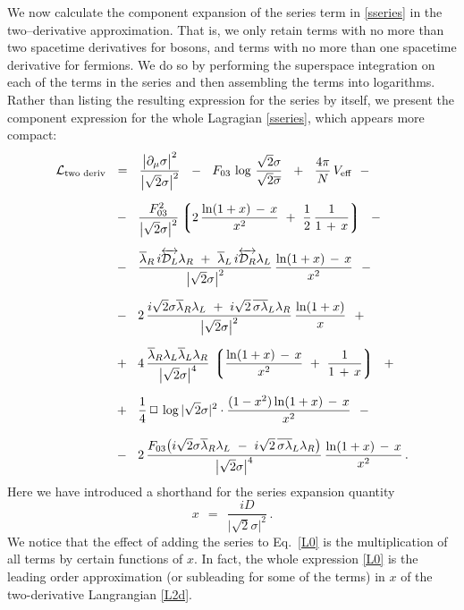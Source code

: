 \documentclass[epsfig,12pt]{article}
\def\beq{\begin{equation}}
\def\eeq{\end{equation}}
\newcommand{\cell}{{\mathcal L}}
\newcommand{\p}{\partial}
\newcommand{\ov}{\overline}
\newcommand{\md}{\mathcal{D}}
\newcommand{\lgr}{\left\lgroup}
\newcommand{\rgr}{\right\rgroup}
\begin{document}
	We now calculate the component expansion of the series term in \eqref{sseries}
	in the two--derivative approximation. 
	That is, we only retain terms with no more than two spacetime derivatives for bosons,
	and terms with no more than one spacetime derivative for fermions.
	We do so by performing the superspace integration on each of the terms in the
	series and then assembling the terms into logarithms.
	Rather than listing the resulting expression for the series by itself, we present the
	component expression for the whole Lagragian \eqref{sseries}, which appears more compact:
\begin{align}
%
\notag
	\cell_\text{two deriv} &    ~~=~~  
	\frac{ \big|\p_\mu \sigma\big|^2 }
	{ \big|\sqrt{2}\sigma\big|^2 }
	~~-~~
	F_{03}\, \log\, \frac{\sqrt{2}\sigma}{\sqrt{2}\ov\sigma}
	~~+~~
	\frac{4\pi}{N}\, V_\text{eff}
	~~-
	\\[2mm]
%
\notag
	&
	~~-~~
	\frac{F_{03}^2}{\big|\sqrt{2}\sigma\big|^2}
	\lgr 2\, \frac{ \ln (1 + x) \,-\, x } { x^2 }  ~+~
		\frac{1}{2}\, \frac{1}{1 \,+\, x} \rgr
	~~-
	\\[2mm]
%
\notag
	&
	~~-~~
	\frac{
		\ov\lambda{}_R\, i\overleftrightarrow{\md_L} \lambda_R  ~+~ 
		\ov\lambda{}_L\, i\overleftrightarrow{\md_R} \lambda_L
	} { \big|\sqrt{2}\sigma\big|^2 }
	\,
	\frac{ \ln (1 + x) \,-\, x } { x^2 }
	~~-
	\\[2mm]
%
\label{L2d}
	&
	~~-~~ 
	2\,\frac{
		i\sqrt{2}\sigma\ov\lambda{}_R\lambda_L  ~+~  
		i\sqrt{2}\,\ov{\sigma\lambda}{}_L\lambda_R
	} { \big|\sqrt{2}\sigma\big|^2 }\,
	\frac{ \ln (1 + x) } { x }
	~~+
	\\[2mm]
%
\notag
	&
	~~+~~
	4\,\frac{
		\ov\lambda{}_R \lambda_L \ov\lambda{}_L \lambda_R
	} { \big|\sqrt{2}\sigma\big|^4 }\,
	\lgr \frac{ \ln (1 + x) \,-\, x } { x^2 }  ~+~
		\frac{1}{1 \,+\, x} \rgr
	~~+
	\\[2mm]
%
\notag
	&
	~~+~~
	\frac{1}{4}\,\Box\,\log |\sqrt{2}\sigma|^2 \cdot
	\frac{ (1 - x^2) \ln (1 + x) \,-\, x } { x^2 }
	~~-
	\\[3mm]
%
\notag
	&
	~~-~~
	2\,\frac{ F_{03} \big( i\sqrt{2}\sigma\ov\lambda{}_R\lambda_L ~-~
			       i\sqrt{2}\,\ov{\sigma\lambda}{}_L\lambda_R \big) }
		{ \big|\sqrt{2}\sigma\big|^4 }\,
	\frac{ \ln (1 + x) \,-\, x } { x^2 }\,.
\end{align}
	Here we have introduced a shorthand for the series expansion quantity
\beq
	x    ~~=~~    \frac{iD}{\big|\sqrt{2}\sigma\big|^2}\,.
\eeq
	We notice that the effect of adding the series to Eq.~\eqref{L0} is the multiplication of all terms 
	by certain functions of $ x $.
	In fact, the whole expression \eqref{L0}
	is the leading order approximation (or subleading for some of the terms) in $ x $ of 
	the two-derivative Langrangian \eqref{L2d}.
\end{document}
